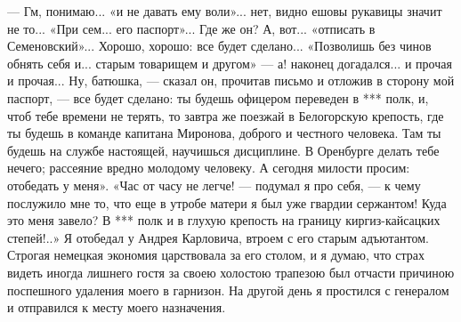 — Гм, понимаю... «и не давать ему воли»... нет, видно ешовы рукавицы значит не то... «При сем... его паспорт»... Где же он? А, вот... «отписать в Семеновский»... Хорошо, хорошо: все будет сделано... «Позволишь без чинов обнять себя и... старым товарищем и другом» — а! наконец догадался... и прочая и прочая... Ну, батюшка, — сказал он, прочитав письмо и отложив в сторону мой паспорт, — все будет сделано: ты будешь офицером переведен в *** полк, и, чтоб тебе времени не терять, то завтра же поезжай в Белогорскую крепость, где ты будешь в команде капитана Миронова, доброго и честного человека. Там ты будешь на службе настоящей, научишься дисциплине. В Оренбурге делать тебе нечего; рассеяние вредно молодому человеку. А сегодня милости просим: отобедать у меня».
«Час от часу не легче! — подумал я про себя, — к чему послужило мне то, что еще в утробе матери я был уже гвардии сержантом! Куда это меня завело? В *** полк и в глухую крепость на границу киргиз-кайсацких степей!..» Я отобедал у Андрея Карловича, втроем с его старым адъютантом. Строгая немецкая экономия царствовала за его столом, и я думаю, что страх видеть иногда лишнего гостя за своею холостою трапезою был отчасти причиною поспешного удаления моего в гарнизон. На другой день я простился с генералом и отправился к месту моего назначения.